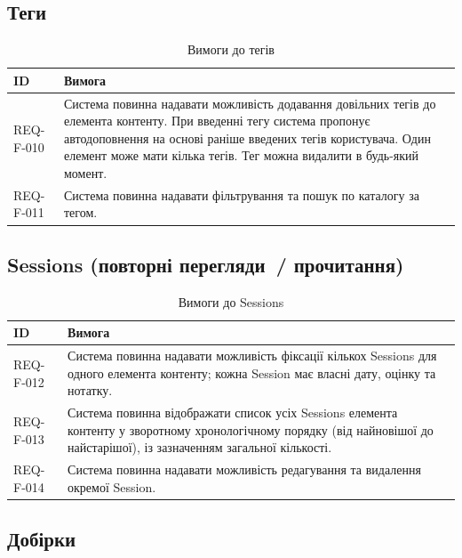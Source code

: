 \subsection{Теги}

\begin{table}[h]
\caption{Вимоги до тегів}
\label{tab:tehy}
\begin{tabular}{L{2.5cm} L{11.5cm}}
\toprule
\textbf{ID} & \textbf{Вимога} \\
\midrule
REQ-F-010 & Система повинна надавати можливість додавання довільних тегів до елемента контенту. При введенні тегу система пропонує автодоповнення на основі раніше введених тегів користувача. Один елемент може мати кілька тегів. Тег можна видалити в будь-який момент.  \\
\addlinespace
REQ-F-011 & Система повинна надавати фільтрування та пошук по каталогу за тегом.  \\
\bottomrule
\end{tabular}
\end{table}

\subsection{Sessions (повторні перегляди~/ прочитання)}

\begin{table}[h]
\caption{Вимоги до Sessions}
\label{tab:sessions}
\begin{tabular}{L{2.5cm} L{11.5cm}}
\toprule
\textbf{ID} & \textbf{Вимога} \\
\midrule
REQ-F-012 & Система повинна надавати можливість фіксації кількох Sessions для одного елемента контенту; кожна Session має власні дату, оцінку та нотатку.  \\
\addlinespace
REQ-F-013 & Система повинна відображати список усіх Sessions елемента контенту у зворотному хронологічному порядку (від найновішої до найстарішої), із зазначенням загальної кількості.  \\
\addlinespace
REQ-F-014 & Система повинна надавати можливість редагування та видалення окремої Session.  \\
\bottomrule
\end{tabular}
\end{table}

\subsection{Добірки}

